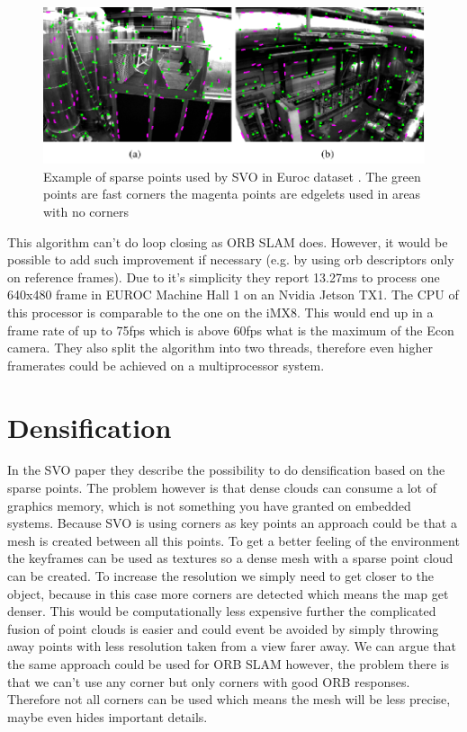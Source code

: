 \documentclass[11pt,a4paper,titlepage,oneside]{report}
\begin{document}
\begin{figure}[H]
  \begin{center}
		\includegraphics[width=1.0\textwidth]{img/svo.png}
  \end{center}
	\caption{Example of sparse points used by SVO in Euroc dataset \cite{svo}. The green points are fast corners the magenta points are edgelets used in areas with no corners}\label{fig:svo}
\end{figure}

This algorithm can't do loop closing as ORB SLAM does. However, it would be possible to add such improvement if necessary (e.g. by using orb descriptors only on reference frames). Due to it's simplicity they report 13.27ms to process one 640x480 frame in EUROC Machine Hall 1 on an Nvidia Jetson TX1. The CPU of this processor is comparable to the one on the iMX8. This would end up in a frame rate of up to 75fps which is above 60fps what is the maximum of the Econ camera. They also split the algorithm into two threads, therefore even higher framerates could be achieved on a multiprocessor system.

\section{Densification}

In the SVO paper they describe the possibility to do densification based on the sparse points. The problem however is that dense clouds can consume a lot of graphics memory, which is not something you have granted on embedded systems. Because SVO is using corners as key points an approach could be that a mesh is created between all this points. To get a better feeling of the environment the keyframes can be used as textures so a dense mesh with a sparse point cloud can be created. To increase the resolution we simply need to get closer to the object, because in this case more corners are detected which means the map get denser. This would be computationally less expensive further the complicated fusion of point clouds is easier and could event be avoided by simply throwing away points with less resolution taken from a view farer away. We can argue that the same approach could be used for ORB SLAM however, the problem there is that we can't use any corner but only corners with good ORB responses. Therefore not all corners can be used which means the mesh will be less precise, maybe even hides important details.
\end{document}
